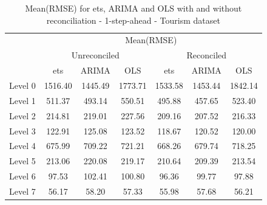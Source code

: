 \documentclass[11pt,a4paper,]{article}
\begin{document}
\begin{table}[t]

\caption{\label{tab:unnamed-chunk-1}Mean(RMSE) for ets, ARIMA and OLS with and without reconciliation - 1-step-ahead - Tourism dataset}
\centering
\begin{tabular}{ccccccc}
\toprule
\multicolumn{1}{c}{} & \multicolumn{6}{c}{Mean(RMSE)} \\
\cmidrule(l{2pt}r{2pt}){2-7}
\multicolumn{1}{c}{} & \multicolumn{3}{c}{Unreconciled} & \multicolumn{3}{c}{Reconciled} \\
\cmidrule(l{2pt}r{2pt}){2-4} \cmidrule(l{2pt}r{2pt}){5-7}
 & ets & ARIMA & OLS & ets & ARIMA & OLS\\
\midrule
Level 0 & 1516.40 & 1445.49 & 1773.71 & 1533.58 & 1453.44 & 1842.14\\
Level 1 & 511.37 & 493.14 & 550.51 & 495.88 & 457.65 & 523.40\\
Level 2 & 214.81 & 219.01 & 227.56 & 209.16 & 207.52 & 216.33\\
Level 3 & 122.91 & 125.08 & 123.52 & 118.67 & 120.52 & 120.00\\
Level 4 & 675.99 & 709.22 & 721.21 & 668.26 & 679.74 & 718.25\\
Level 5 & 213.06 & 220.08 & 219.17 & 210.64 & 209.39 & 213.54\\
Level 6 & 97.53 & 102.41 & 100.80 & 96.36 & 99.77 & 97.88\\
Level 7 & 56.17 & 58.20 & 57.33 & 55.98 & 57.68 & 56.21\\
\bottomrule
\end{tabular}
\end{table}
\end{document}
